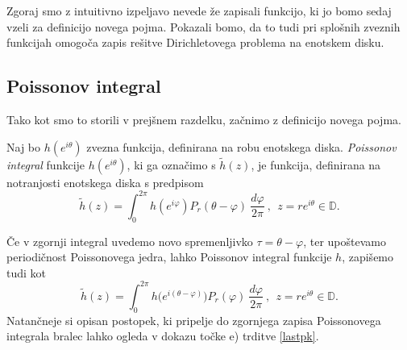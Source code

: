 \documentclass[mat1, tisk]{fmfdelo}
\begin{document}
    Zgoraj smo z intuitivno izpeljavo nevede že zapisali funkcijo, ki jo bomo sedaj vzeli za definicijo novega pojma. 
    Pokazali bomo, da to tudi pri splošnih zveznih funkcijah omogoča zapis rešitve Dirichletovega problema na enotskem disku.

\subsection{Poissonov integral}

    Tako kot smo to storili v prejšnem razdelku, začnimo z definicijo novega pojma.

    \begin{definicija}
        Naj bo $h(e^{i \theta})$ zvezna funkcija, definirana na robu enotskega diska.
        \emph{Poissonov integral} funkcije $h(e^{i\theta})$, ki ga označimo s $\widetilde{h}(z)$, je funkcija, definirana na notranjosti enotskega diska s predpisom
        $$
        \widetilde{h}(z) = \int_{0}^{2\pi}{h(e^{i\varphi}) P_r(\theta - \varphi)~\frac{d\varphi}{2 \pi}}~,~~z = r e^{i\theta} \in \mathbb{D}.
        $$
     \end{definicija}
     \begin{opomba}
        \label{kom_poiss}
        Če v zgornji integral uvedemo novo spremenljivko $\tau = \theta - \varphi$, ter upoštevamo periodičnost Poissonovega jedra, lahko Poissonov integral funkcije $h$, zapišemo tudi kot
        $$
        \widetilde{h}(z) = \int_{0}^{2\pi}{h\big(e^{i(\theta-\varphi)}\big) P_r(\varphi)~\frac{d\varphi}{2 \pi}}~,~~z = r e^{i\theta} \in \mathbb{D}.
        $$
        Natančneje si opisan postopek, ki pripelje do zgornjega zapisa Poissonovega integrala bralec lahko ogleda v dokazu točke e) trditve \ref{lastpk}.
     \end{opomba}
\end{document}
